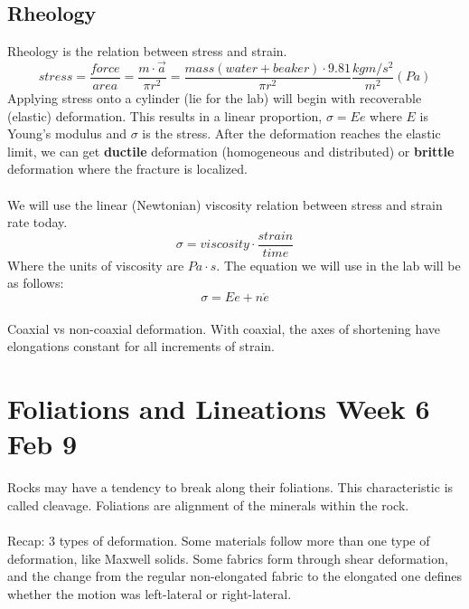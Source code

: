 \documentclass[12pt,a4paper]{report}
\begin{document}
\subsection*{Rheology}
Rheology is the relation between stress and strain.
$$ stress = \frac{force}{area} = \frac{m \cdot \vec{a}}{\pi r^2} = \frac{mass(water + beaker) \cdot 9.81}{\pi r^2} \frac{kg m/s^2}{m^2} (Pa)$$
Applying stress onto a cylinder (lie for the lab) will begin with recoverable (elastic) deformation.
This results in a linear proportion, $ \sigma = Ee $ where $E$ is Young's modulus and $\sigma$ is the stress.
After the deformation reaches the elastic limit, we can get \textbf{ductile} deformation (homogeneous and distributed) or \textbf{brittle} deformation where the fracture is localized.\\
\\
We will use the linear (Newtonian) viscosity relation between stress and strain rate today.
$$ \sigma = viscosity \cdot \frac{strain}{time} $$
Where the units of viscosity are $Pa \cdot s$.
The equation we will use in the lab will be as follows:
$$ \sigma = Ee + n\mathring{e} $$
\\
Coaxial vs non-coaxial deformation. With coaxial, the axes of shortening have elongations constant for all increments of strain. 
\section*{Foliations and Lineations Week 6 Feb 9}
Rocks may have a tendency to break along their foliations.
This characteristic is called cleavage.
Foliations are alignment of the minerals within the rock.\\
\\
Recap: 3 types of deformation.
Some materials follow more than one type of deformation, like Maxwell solids.
Some fabrics form through shear deformation, and the change from the regular non-elongated fabric to the elongated one defines whether the motion was left-lateral or right-lateral.
\end{document}
